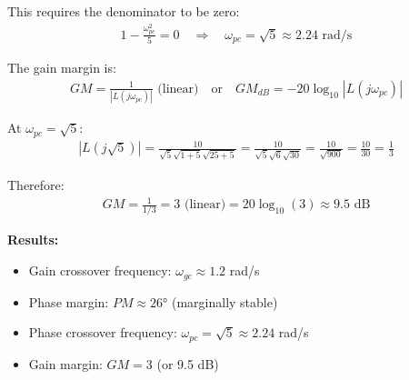 \documentclass[11pt,a4paper]{article}
\begin{document}
This requires the denominator to be zero:
\begin{align}
  1 - \frac{\omega_{pc}^2}{5} = 0 \quad \Rightarrow \quad \omega_{pc} = \sqrt{5} \approx 2.24 \text{ rad/s}
\end{align}

The gain margin is:
\begin{align}
  GM = \frac{1}{|L(j\omega_{pc})|} \text{ (linear)} \quad \text{or} \quad GM_{dB} = -20\log_{10}|L(j\omega_{pc})|
\end{align}

At $\omega_{pc} = \sqrt{5}$:
\begin{align}
  |L(j\sqrt{5})| = \frac{10}{\sqrt{5}\sqrt{1+5}\sqrt{25+5}} = \frac{10}{\sqrt{5}\sqrt{6}\sqrt{30}} = \frac{10}{\sqrt{900}} = \frac{10}{30} = \frac{1}{3}
\end{align}

Therefore:
\begin{align}
  GM = \frac{1}{1/3} = 3 \text{ (linear)} = 20\log_{10}(3) \approx 9.5 \text{ dB}
\end{align}

\textbf{Results:}
\begin{itemize}
  \item Gain crossover frequency: $\omega_{gc} \approx 1.2$ rad/s
  \item Phase margin: $PM \approx 26°$ (marginally stable)
  \item Phase crossover frequency: $\omega_{pc} = \sqrt{5} \approx 2.24$ rad/s
  \item Gain margin: $GM = 3$ (or 9.5 dB)
\end{itemize}
\end{document}
